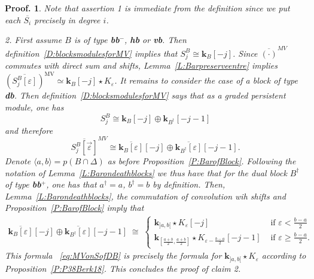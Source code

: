 \documentclass[a4paper, english, 11pt]{article}
\newcommand{\kk}[0]{\textbf{k}}
\newcommand{\0}{\vec{0}}
\newcommand{\MV}{\text{MV}}
\newtheorem*{pf}{Proof.} }
\begin{document}
\begin{pf}
 Note that assertion 1 is immediate from the definition since we put each $\overline{S_i}$ precisely in degree $i$.   


\smallskip 

2. First assume $B$ is of type  \textbf{bb$^-$}, \textbf{hb} or \textbf{vb}. Then  definition~\ref{D:blocksmodulesforMV} implies that $S_j^B \cong \kk_B[-j]$. Since  $\overline{(\cdot)}^{MV}$ commutes with direct 
sum and shifts, Lemma~\ref{L:Barpreserveentre} implies $(\overline{S_j^B [\varepsilon]})^{\MV} \simeq \kk_B[-j] \star K_\varepsilon $. It remains to consider the case of a block of type \textbf{db}. Then definition~\ref{D:blocksmodulesforMV} says that as a graded persistent module, one has $$S_j^B \cong \kk_B[-j] \oplus \kk_{B^\dagger}[-j-1]$$ and therefore  $$\overline{S_j^B[\vec{\varepsilon}]}^{MV} \cong \overline{\kk_B[\varepsilon]}[-j] \oplus \overline{\kk_{B^\dagger}[\varepsilon]}[-j-1].$$ Denote $\langle a, b\rangle =p(B \cap \Delta)$ as before Proposition~\ref{P:BarofBlock}. Following the notation of 
Lemma~\ref{L:Barondeathblocks} we thus have that for the dual block $B^\dagger$ of type \textbf{bb}$^{+}$, one has that $a^\dagger=a$, $b^\dagger=b$ by definition. Then, Lemma~\ref{L:Barondeathblocks}, the commutation of convolution wih shifts and Proposition~\ref{P:BarofBlock} imply that 
\begin{multline}\label{eq:MVonSofDB}
\overline{\kk_B[\varepsilon]}[-j] \oplus \overline{\kk_{B^\dagger}[\varepsilon]}[-j-1] \;
  \cong \;\left\{ \begin{array}{ll}  \kk_{]a,b[}\star K_{\varepsilon}[-j] & \mbox{ if $\varepsilon< \frac{b-a}{2}$}\\
 \kk_{[\frac{a+b}{2}, \frac{a+b}{2}]}\star K_{\varepsilon -\frac{b -a}{2}} [-j-1] & \mbox{ if $\varepsilon \geqslant \frac{b-a}{2}$.} \end{array}   \right .
\end{multline}
This formula ~\eqref{eq:MVonSofDB} is precisely the formula for $\kk_{]a,b[}\star K_{\varepsilon}$ according to Proposition~\ref{P:P38Berk18}. This concludes the proof of claim 2.

\smallskip


\end{pf}
\end{document}
